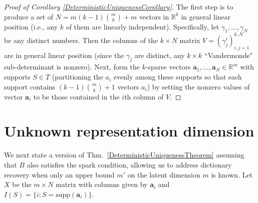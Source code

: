 \documentclass[journal, twocolumn]{IEEEtran}
\begin{document}
\begin{proof}[Proof of Corollary \ref{DeterministicUniquenessCorollary}]
The first step is to produce a set of $N = m(k-1){m \choose k}+m$ vectors in $\mathbb{R}^k$ in general linear position (i.e., any $k$ of them are linearly independent).  Specifically, let $\gamma_1, \ldots, \gamma_N$ be any distinct numbers. Then the columns of the $k \times N$ matrix $V = (\gamma^i_j)^{k,N}_{i,j=1}$ are in general linear position (since the $\gamma_j$ are distinct, any $k \times k$ ``Vandermonde" sub-determinant is nonzero). Next, form the $k$-sparse vectors $\mathbf{a}_1, \ldots, \mathbf{a}_N \in \mathbb{R}^m$ with supports $S \in T$ (partitioning the $a_i$ evenly among these supports so that each support contains $(k-1){m \choose k}+1$ vectors $a_i$) by setting the nonzero values of vector $\mathbf{a}_i$ to be those contained in the $i$th column of $V$.
\end{proof}


\section{Unknown representation dimension}\label{mleqm}

We next state a version of Thm.~\ref{DeterministicUniquenessTheorem} assuming that $B$ also satisfies the spark condition, allowing us to address dictionary recovery when only an upper bound $m'$ on the latent dimension $m$ is known. Let $X$ be the $m \times N$ matrix with columns given by $\mathbf{a}_i$ and $I(S) = \{i : S = \text{supp}(\mathbf{a}_i)\}$.
\end{document}
